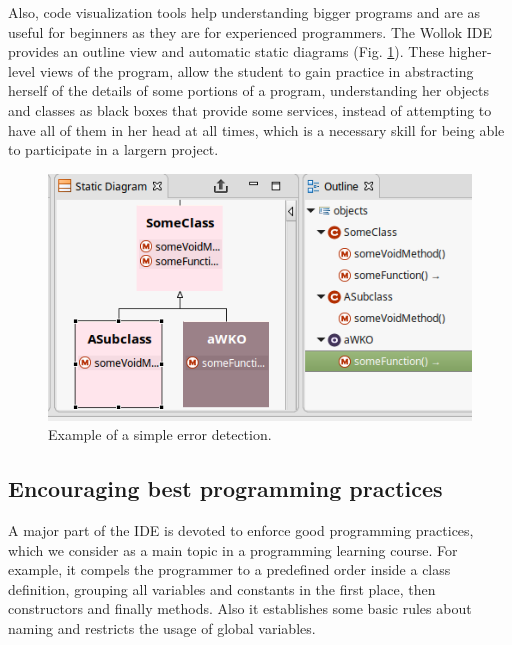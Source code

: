 Also, code visualization tools help understanding bigger programs and are as useful for beginners as they are for experienced programmers.
The Wollok IDE provides an outline view and automatic static diagrams (\cf Fig. \ref{fig:outline}).
These higher-level views of the program, allow the student to gain practice in abstracting herself of the details of some portions of a program, understanding her objects and classes as black boxes that provide some services, instead of attempting to have all of them in her head at all times, which is a necessary skill for being able to participate in a largern project.

\begin{figure}[ht]
 \centering
 \includegraphics[scale=0.5]{images/outline.png}
 \caption{\small Example of a simple error detection.}
 \label{fig:outline}
\end{figure}


\subsection{Encouraging best programming practices}
A major part of the IDE is devoted to enforce good programming practices, which we consider as a main topic in a programming learning course.
For example, it compels the programmer to a predefined order inside a class definition, \ie grouping all variables and constants in the first place, then constructors and finally methods. 
Also it establishes some basic rules about naming and restricts the usage of global variables.

